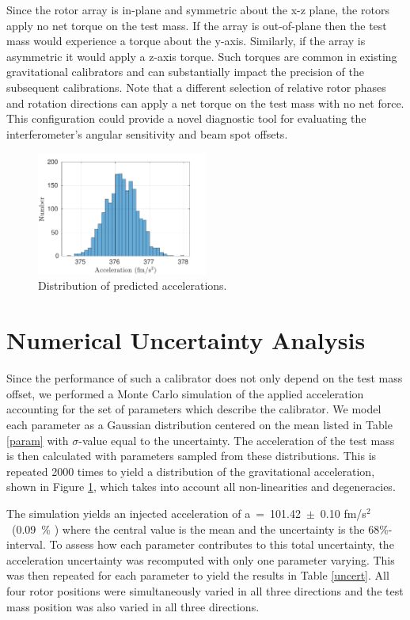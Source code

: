 \documentclass[superscriptaddress, twocolumn, prd]{revtex4-1}
\begin{document}
Since the rotor array is in-plane and symmetric about the x-z plane, the rotors apply no net torque on the test mass. If the array is out-of-plane then the test mass would experience a torque about the y-axis. Similarly, if the array is asymmetric it would apply a z-axis torque. Such torques are common in existing gravitational calibrators and can substantially impact the precision of the subsequent calibrations. Note that a different selection of relative rotor phases and rotation directions can apply a net torque on the test mass with no net force. This configuration could provide a novel diagnostic tool for evaluating the interferometer's angular sensitivity and beam spot offsets.

\begin{figure}[!h]
\centering \includegraphics[width=0.5\textwidth]{Super4_Dist.pdf}
\caption{Distribution of predicted accelerations.}
\label{dist} 
\end{figure}

\section{Numerical Uncertainty Analysis}

Since the performance of such a calibrator does not only depend on the test mass offset, we performed a Monte Carlo simulation of the applied acceleration accounting for the set of parameters which describe the calibrator. We model each parameter as a Gaussian distribution centered on the mean listed in Table \ref{param} with $\sigma$-value equal to the uncertainty. The acceleration of the test mass is then calculated with parameters sampled from these distributions. This is repeated 2000 times to yield a distribution of the gravitational acceleration, shown in Figure \ref{dist}, which takes into account all non-linearities and degeneracies. 


The simulation yields an injected acceleration of a~=~101.42~$\pm$~0.10 fm/s$^2$~(0.09~\% ) where the central value is the mean and the uncertainty is the 68\%-interval. To assess how each parameter contributes to this total uncertainty, the acceleration uncertainty was recomputed with only one parameter varying. This was then repeated for each parameter to yield the results in Table \ref{uncert}. All four rotor positions were simultaneously varied  in all three directions and the test mass position was also varied in all three directions.
\end{document}
